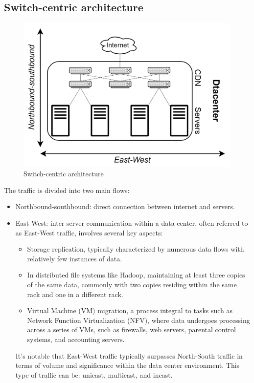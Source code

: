 \subsection{Switch-centric architecture}
\begin{figure}[H]
    \centering
    \includegraphics[width=0.6\linewidth]{images/sc.png}
    \caption{Switch-centric architecture}
\end{figure}
The traffic is divided into two main flows: 
\begin{itemize}
    \item Northbound-southbound: direct connection between internet and servers. 
    \item East-West: inter-server communication within a data center, often referred to as East-West traffic, involves several key aspects:
        \begin{itemize}
            \item Storage replication, typically characterized by numerous data flows with relatively few instances of data.
            \item In distributed file systems like Hadoop, maintaining at least three copies of the same data, commonly with two copies residing within the same rack and one in a different rack.
            \item Virtual Machine (VM) migration, a process integral to tasks such as Network Function Virtualization (NFV), where data undergoes processing across a series of VMs, such as firewalls, web servers, parental control systems, and accounting servers.
        \end{itemize}
        It's notable that East-West traffic typically surpasses North-South traffic in terms of volume and significance within the data center environment.
        This type of traffic can be: unicast, multicast, and incast. 
\end{itemize}

